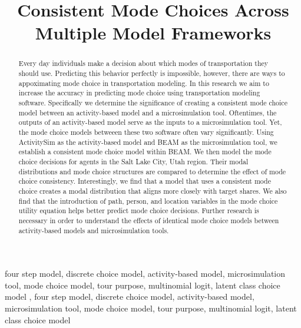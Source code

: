 \documentclass[3p, authoryear, review]{elsarticle} %
\begin{document}
\begin{frontmatter}

  \title{Consistent Mode Choices Across\\
Multiple Model Frameworks}
    \author[]{}
  
  
  \begin{abstract}
  Every day individuals make a decision about which modes of transportation they should use. Predicting this behavior perfectly is impossible, however, there are ways to appoximating mode choice in transportation modeling. In this research we aim to increase the accuracy in predicting mode choice using transportation modeling software. Specifically we determine the significance of creating a consistent mode choice model between an activity-based model and a microsimulation tool. Oftentimes, the outputs of an activity-based model serve as the inputs to a microsimulation tool. Yet, the mode choice models betweeen these two software often vary significantly. Using ActivitySim as the activity-based model and BEAM as the microsimulation tool, we establish a consistent mode choice model within BEAM. We then model the mode choice decisions for agents in the Salt Lake City, Utah region. Their modal distributions and mode choice structures are compared to determine the effect of mode choice consistency. Interestingly, we find that a model that uses a consistent mode choice creates a modal distribution that aligns more closely with target shares. We also find that the introduction of path, person, and location variables in the mode choice utility equation helps better predict mode choice decisions. Further research is necessary in order to understand the effects of identical mode choice models between activity-based models and microsimulation tools.
  \end{abstract}
    \begin{keyword}
    four step model, discrete choice model, activity-based model, microsimulation tool, mode choice model, tour purpose, multinomial logit, latent class choice model \sep 
    four step model, discrete choice model, activity-based model, microsimulation tool, mode choice model, tour purpose, multinomial logit, latent class choice model
  \end{keyword}
  
 \end{frontmatter}
\end{document}
